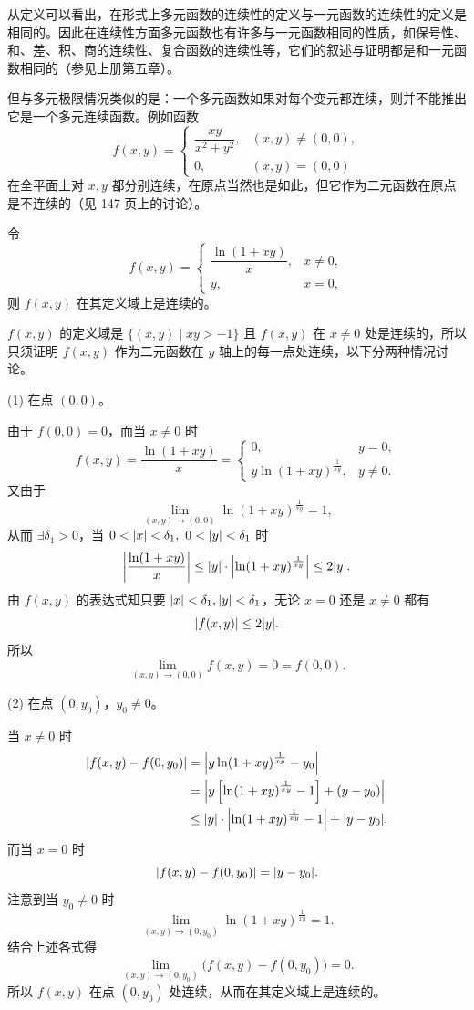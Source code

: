 从定义可以看出，在形式上多元函数的连续性的定义与一元函数的连续性的定义是相同的。因此在连续性方面多元函数也有许多与一元函数相同的性质，如保号性、和、差、积、商的连续性、复合函数的连续性等，它们的叙述与证明都是和一元函数相同的（参见上册第五章）。

但与多元极限情况类似的是：一个多元函数如果对每个变元都连续，则并不能推出它是一个多元连续函数。例如函数
\[
  f(x,y)=
  \begin{cases}
    \dfrac{xy}{x^2+y^2}, & (x,y)\ne(0,0),\\[4pt]
    0, & (x,y)=(0,0)
  \end{cases}
\]
在全平面上对 $x,y$ 都分别连续，在原点当然也是如此，但它作为二元函数在原点是不连续的（见 147 页上的讨论）。

\begin{xexample}[18.2.1]
令
\[
  f(x,y)=
  \begin{cases}
    \dfrac{\ln(1+xy)}{x}, & x\ne0,\\[5pt]
    y, & x=0,
  \end{cases}
\]
则 $f(x,y)$ 在其定义域上是连续的。
\end{xexample}
\begin{xproof}
$f(x,y)$ 的定义域是 $\{(x,y)\mid xy>-1\}$ 且 $f(x,y)$ 在 $x\ne0$ 处是连续的，所以只须证明 $f(x,y)$ 作为二元函数在 $y$ 轴上的每一点处连续，以下分两种情况讨论。

(1) 在点 $(0,0)$。

由于 $f(0,0)=0$，而当 $x\ne0$ 时
\[
  f(x,y)=\frac{\ln(1+xy)}{x}
  =
  \begin{cases}
    0, & y=0,\\[3pt]
    y\ln(1+xy)^{\frac1{xy}}, & y\ne0.
  \end{cases}
\]
又由于
\[
  \lim_{(x,y)\to(0,0)}\ln(1+xy)^{\frac1{xy}}=1,
\]
从而 $\exists\delta_1>0$，当 $0<\abs{x}<\delta_1,\ 0<\abs{y}<\delta_1$ 时
\[
  \abs*{\frac{\ln(1+xy)}{x}}
  \le\abs{y}\cdot\abs*{\ln(1+xy)^{\frac1{xy}}}
  \le2\abs{y}.
\]
由 $f(x,y)$ 的表达式知只要 $\abs{x}<\delta_1,\abs{y}<\delta_1$，无论 $x=0$ 还是 $x\ne0$ 都有
\[
  \abs{f(x,y)}\le2\abs{y}.
\]
所以
\[
  \lim_{(x,y)\to(0,0)}f(x,y)=0=f(0,0).
\]

(2) 在点 $(0,y_0)$，$y_0\ne0$。

当 $x\ne0$ 时
\begin{align*}
  \abs{f(x,y)-f(0,y_0)}
  &=\abs*{y\ln(1+xy)^{\frac1{xy}}-y_0}\\
  &=\abs*{y\left[\ln(1+xy)^{\frac1{xy}}-1\right]+(y-y_0)}\\
  &\le \abs{y}\cdot\abs*{\ln(1+xy)^{\frac1{xy}}-1}+\abs{y-y_0}.
\end{align*}
而当 $x=0$ 时
\[
  \abs{f(x,y)-f(0,y_0)}=\abs{y-y_0}.
\]
注意到当 $y_0\ne0$ 时
\[
  \lim_{(x,y)\to(0,y_0)}\ln(1+xy)^{\frac1{xy}}=1.
\]
结合上述各式得
\[
  \lim_{(x,y)\to(0,y_0)}\bigl(f(x,y)-f(0,y_0)\bigr)=0.
\]
所以 $f(x,y)$ 在点 $(0,y_0)$ 处连续，从而在其定义域上是连续的。
\end{xproof}

